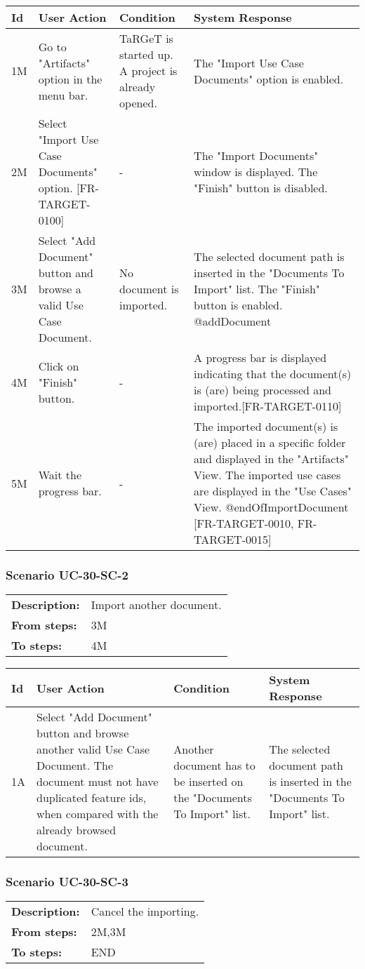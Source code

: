 \documentclass[a4paper,11pt]{article}
\newcommand{\bl}{\\ \hline}
\begin{document}
\begin{tabular}{|p{0.8in}|p{1.6in}|p{1.6in}|p{1.6in}|}
\hline
Id & User Action & Condition & System Response  \bl 
1M & Go to "Artifacts" option in the menu bar. & TaRGeT is started up. A project is already opened. & The "Import Use Case Documents" option is enabled. \bl 
2M & Select "Import Use Case Documents" option. [FR-TARGET-0100] & - & The "Import Documents" window is displayed. The "Finish" button is disabled. \bl 
3M & Select "Add Document" button and browse a valid Use Case Document. & No document is imported. & 
		      The selected document path is inserted in the "Documents To Import" list. The "Finish" button is enabled. @addDocument
		     \bl 
4M & Click on "Finish" button. & - & A progress bar is displayed indicating that the document(s) is (are) being processed and imported.[FR-TARGET-0110] \bl 
5M & Wait the progress bar. & - & The imported document(s) is (are) placed in a specific folder and displayed in the "Artifacts" View. The imported use cases are displayed in the "Use Cases" View. @endOfImportDocument [FR-TARGET-0010, FR-TARGET-0015] \bl 
\end{tabular}
\subsubsection*{Scenario UC-30-SC-2}
\begin{tabular}{p{1in}p{4in}}
{\bf Description:} & Import another document. \\
{\bf From steps:} & 3M \\
{\bf To steps:} & 4M \\
\end{tabular}
 
\begin{tabular}{|p{0.8in}|p{1.6in}|p{1.6in}|p{1.6in}|}
\hline
Id & User Action & Condition & System Response  \bl 
1A & Select "Add Document" button and browse another valid Use Case Document. The document must not have duplicated feature ids, when compared with the already browsed document. & Another document has to be inserted on the "Documents To Import" list. & The selected document path is inserted in the "Documents To Import" list. \bl 
\end{tabular}
\subsubsection*{Scenario UC-30-SC-3}
\begin{tabular}{p{1in}p{4in}}
{\bf Description:} & Cancel the importing. \\
{\bf From steps:} & 2M,3M \\
{\bf To steps:} & END \\
\end{tabular}
 
\end{document}

